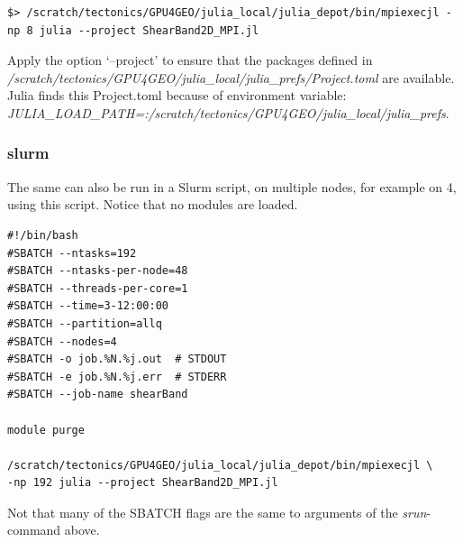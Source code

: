 \documentclass{article}
\begin{document}
\begin{verbatim}
$> /scratch/tectonics/GPU4GEO/julia_local/julia_depot/bin/mpiexecjl -np 8 julia --project ShearBand2D_MPI.jl
\end{verbatim}

Apply the option `--project' to ensure that the packages defined in
\textit{/scratch/tectonics/GPU4GEO/julia\_local/julia\_prefs/Project.toml} are available.
Julia finds this Project.toml because of environment variable:
\textit{JULIA\_LOAD\_PATH=:/scratch/tectonics/GPU4GEO/julia\_local/julia\_prefs}.

\subsubsection{slurm}

The same can also be run in a Slurm script, on multiple nodes, for example on 4, using this script.
Notice that no modules are loaded.

\begin{verbatim}
#!/bin/bash
#SBATCH --ntasks=192
#SBATCH --ntasks-per-node=48
#SBATCH --threads-per-core=1
#SBATCH --time=3-12:00:00
#SBATCH --partition=allq
#SBATCH --nodes=4
#SBATCH -o job.%N.%j.out  # STDOUT
#SBATCH -e job.%N.%j.err  # STDERR
#SBATCH --job-name shearBand

module purge

/scratch/tectonics/GPU4GEO/julia_local/julia_depot/bin/mpiexecjl \
-np 192 julia --project ShearBand2D_MPI.jl
\end{verbatim}

Not that many of the SBATCH flags are the same to arguments of the \textit{srun}-command above.
\end{document}
